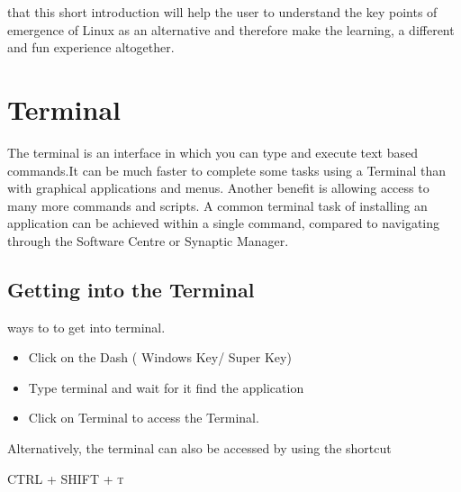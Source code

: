\documentclass{tufte-book} %
\begin{document}
 that this short introduction will help the user to understand the key points of emergence of Linux as an alternative and therefore make the learning, a different and fun experience altogether.

\section{Terminal}
\begin{fullwidth}
The terminal is an interface in which you can type and execute text based commands.It can be much faster to complete some tasks using a Terminal than with graphical applications and menus. Another benefit is allowing access to many more commands and scripts. A common terminal task of installing an application can be achieved within a single command, compared to navigating through the Software Centre or Synaptic Manager. 
\end{fullwidth}
\subsection{Getting into the Terminal}

 ways to to get into terminal.
\begin{itemize}
\item Click on the Dash ( Windows Key/ Super Key)
\item Type terminal and wait for it find the application
\item Click on Terminal to access the Terminal. 
\end{itemize}

Alternatively, the terminal can also be accessed by using the shortcut
\begin{center}
  \textsc{CTRL + SHIFT + t}
\end{center}
\end{document}
